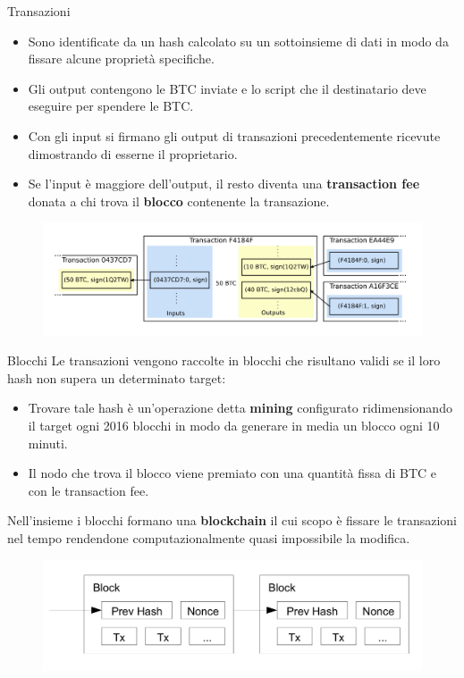 \documentclass[italian]{beamer}
\begin{document}
\begin{frame}{Transazioni} %
\justifying
\begin{itemize}
\justifying
 \item Sono identificate da un hash calcolato su un sottoinsieme di dati in modo da fissare alcune proprietà specifiche.
 \item Gli output contengono le BTC inviate e lo script che il destinatario deve eseguire per spendere le BTC.
 \item Con gli input si firmano gli output di transazioni precedentemente ricevute dimostrando di esserne il proprietario.
 \item Se l'input è maggiore dell'output, il resto diventa una \textbf{transaction fee} donata a chi trova il \textbf{blocco} contenente la transazione.
\end{itemize}
\begin{figure}[htbp]
\centering
\includegraphics[width=\textwidth]{bitcoinpropagation_1.PNG}
\end{figure}
\end{frame}

\begin{frame}{Blocchi} %
\justifying
Le transazioni vengono raccolte in blocchi che risultano validi se il loro hash non supera un determinato target:
\begin{itemize}
\justifying
 \item Trovare tale hash è un'operazione detta \textbf{mining} configurato ridimensionando il target ogni 2016 blocchi in modo da generare in media un blocco ogni 10 minuti.
 \item Il nodo che trova il blocco viene premiato con una quantità fissa di BTC e con le transaction fee.
\end{itemize}
Nell'insieme i blocchi formano una \textbf{blockchain} il cui scopo è fissare le transazioni nel tempo rendendone computazionalmente quasi impossibile la modifica.
\begin{figure}[htp]
\centering
\includegraphics[scale=0.25]{bitcoin_p3_1.PNG}
\end{figure}

\end{frame}
\end{document}
